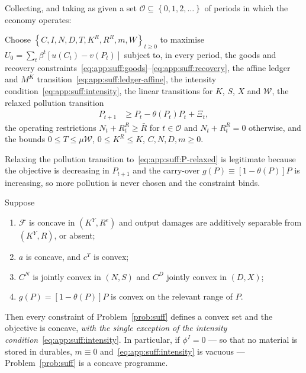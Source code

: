  Collecting, and taking as given a set $\mathcal O\subseteq\left\{0,1,2,\dots\right\}$ of periods in which the economy operates:

\begin{problem}\label{prob:suff}
Choose $\left\{C,I,N,D,T,K^R,R^R,m,W\right\}_{t\ge0}$ to maximise $U_0=\sum_t\beta^t\left[u\left(C_t\right)-v\left(P_t\right)\right]$ subject to, in every period, the goods and recovery constraints~\eqref{eq:app:suff:goods}--\eqref{eq:app:suff:recovery}, the affine ledger and $M^K$ transition~\eqref{eq:app:suff:ledger-affine}, the intensity condition~\eqref{eq:app:suff:intensity}, the linear transitions for $K$, $S$, $X$ and $\mathcal W$, the relaxed pollution transition
\begin{align}
P_{t+1} &\ge P_t-\theta\left(P_t\right)P_t+\Xi_t,
\label{eq:app:suff:P-relaxed}
\end{align}
the operating restrictions $N_t+R^R_t\ge\bar R$ for $t\in\mathcal O$ and $N_t+R^R_t=0$ otherwise, and the bounds $0\le T\le\mu\mathcal W$, $0\le K^R\le K$, $C,N,D,m\ge0$.
\end{problem}

Relaxing the pollution transition to~\eqref{eq:app:suff:P-relaxed} is legitimate because the objective is decreasing in $P_{t+1}$ and the carry-over $g\left(P\right)\equiv\left[1-\theta\left(P\right)\right]P$ is increasing, so more pollution is never chosen and the constraint binds.

\begin{proposition}\label{prop:suff:locus}
Suppose
\begin{enumerate}
\item[(C1)] $\mathcal F$ is concave in $\left(K^Y,R^{e}\right)$ and output damages are additively separable from $\left(K^Y,R\right)$, or absent;
\item[(C2)] $a$ is concave, and $c^T$ is convex;
\item[(C3)] $C^N$ is jointly convex in $\left(N,S\right)$ and $C^D$ jointly convex in $\left(D,X\right)$;
\item[(C4)] $g\left(P\right)=\left[1-\theta\left(P\right)\right]P$ is convex on the relevant range of $P$.
\end{enumerate}
Then every constraint of Problem~\ref{prob:suff} defines a convex set and the objective is concave, \emph{with the single exception of the intensity condition}~\eqref{eq:app:suff:intensity}. In particular, if $\phi^I=0$ --- so that no material is stored in durables, $m\equiv0$ and~\eqref{eq:app:suff:intensity} is vacuous --- Problem~\ref{prob:suff} is a concave programme.
\end{proposition}

